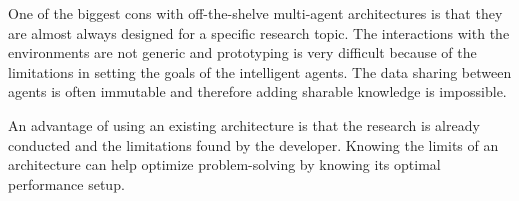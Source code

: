 
One of the biggest cons with off-the-shelve multi-agent architectures is that they are almost
always designed for a specific research topic. The interactions with the environments are
not generic and prototyping is very difficult because of the limitations in setting the goals
of the intelligent agents. The data sharing between agents is often immutable and therefore
adding sharable knowledge is impossible.

An advantage of using an existing architecture is that the research is already conducted
and the limitations found by the developer. Knowing the limits of an architecture can help
optimize problem-solving by knowing its optimal performance setup.